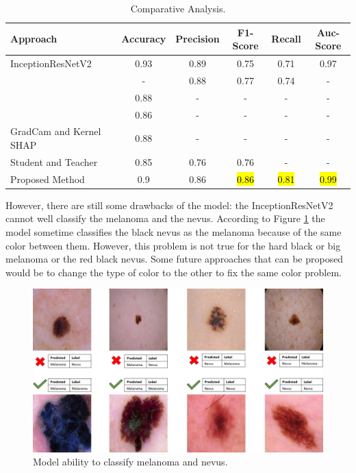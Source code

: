 \documentclass[sensors,article,accept,pdftex,moreauthors]{Definitions/mdpi}
\begin{document}
	
	
	\begin{table}[H]
		\caption{Comparative Analysis.}
		\label{table:comparative-analysis}
				\setlength{\tabcolsep}{1.6mm}\begin{tabular}{ p{5cm}  c  c  c  c  c }
\toprule
\textbf{Approach} & \textbf{Accuracy} & \textbf{Precision} & \textbf{F1-Score} & \textbf{Recall} & \textbf{Auc-Score}\\
\midrule
InceptionResNetV2~\cite{03358} & 0.93 & 0.89 & 0.75 & 0.71 & 0.97\\
\midrule
\cite{03798} & - & 0.88 & 0.77 & 0.74 & - \\
\midrule
\cite{09418} & 0.88 & - & - & - & - \\
\midrule
\cite{01284} & 0.86 & - & - & - & - \\
\midrule
GradCam and Kernel SHAP~\cite{06612} & 0.88 & - & - & - & - \\
\midrule
Student and Teacher~\cite{03225} & 0.85 & 0.76 & 0.76 & - & - \\
\midrule
Proposed Method & 0.9	& 0.86 & \hl{0.86} & \hl{0.81} & \hl{0.99}%
\\
\bottomrule
		\end{tabular}
	\end{table} 

	However, there are still some drawbacks of the model: the InceptionResNetV2 cannot well classify the melanoma and the nevus. According to Figure \ref{fig:nevusVSmela} the model sometime classifies the black nevus as the melanoma because of the same color between them. However, this problem is not true for the hard black or big melanoma or the red black nevus. Some future approaches that can be proposed would be to change the type of color to the other to fix the same color problem.    
	
	\begin{figure}[H]
		\centering
		\includegraphics[width=1\linewidth]{Definitions/img_class_nevus_mela}
		\caption{Model ability to classify melanoma and nevus.}
		\label{fig:nevusVSmela}
	\end{figure}
	
\end{document}
